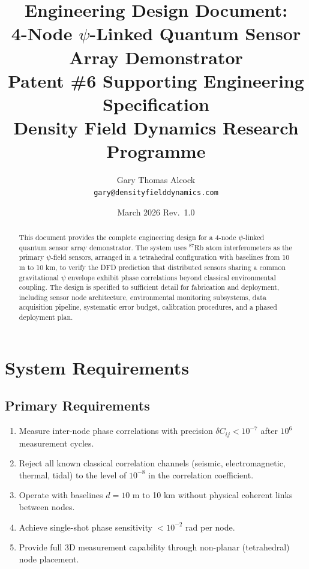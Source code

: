 \documentclass[12pt,a4paper]{article}
\title{\textbf{Engineering Design Document:\\
4-Node $\psi$-Linked Quantum Sensor Array Demonstrator}\\[6pt]
\large Patent \#6 Supporting Engineering Specification\\
\large Density Field Dynamics Research Programme}
\author{Gary Thomas Alcock\\
\texttt{gary@densityfielddynamics.com}}
\date{March 2026 \quad Rev.\ 1.0}
\begin{document}
\maketitle

\begin{abstract}
This document provides the complete engineering design for a 4-node
$\psi$-linked quantum sensor array demonstrator. The system uses
$^{87}$Rb atom interferometers as the primary $\psi$-field sensors,
arranged in a tetrahedral configuration with baselines from 10 m to
10 km, to verify the DFD prediction that distributed sensors sharing
a common gravitational $\psi$ envelope exhibit phase correlations
beyond classical environmental coupling. The design is specified to
sufficient detail for fabrication and deployment, including sensor
node architecture, environmental monitoring subsystems, data
acquisition pipeline, systematic error budget, calibration procedures,
and a phased deployment plan.
\end{abstract}

\tableofcontents
\newpage

\section{System Requirements}\label{sec:requirements}

\subsection{Primary Requirements}

\begin{enumerate}[label=\textbf{PR-\arabic*}]
\item Measure inter-node phase correlations with precision
$\delta C_{ij} < 10^{-7}$ after $10^6$ measurement cycles.
\item Reject all known classical correlation channels (seismic,
electromagnetic, thermal, tidal) to the level of $10^{-8}$ in the
correlation coefficient.
\item Operate with baselines $d = 10$ m to 10 km without physical
coherent links between nodes.
\item Achieve single-shot phase sensitivity $< 10^{-2}$ rad per node.
\item Provide full 3D measurement capability through non-planar
(tetrahedral) node placement.
\end{enumerate}
\end{document}
